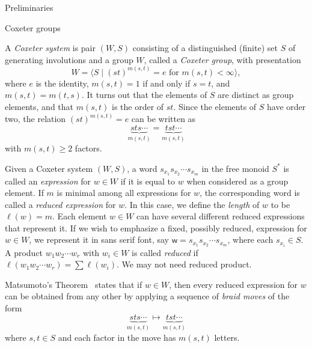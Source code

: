 \documentclass[11pt]{amsart}
\theoremstyle{definition}
\numberwithin{equation}{section}
\newcommand{\supp}{\mathrm{supp}}
\renewcommand{\(}{\left(}
\renewcommand{\)}{\right)}
\newcommand{\w}{\mathsf{w}}
\begin{document}

\begin{section}{Preliminaries}\label{sec:prelim}


\begin{subsection}{Coxeter groups}\label{subsec:coxeter groups}

A \emph{Coxeter system} is pair $(W,S)$ consisting of a distinguished (finite) set $S$ of generating involutions and a group $W$, called a \emph{Coxeter group}, with presentation
\[
W = \langle S \mid (st)^{m(s, t)} = e \text{ for } m(s, t) < \infty \rangle,
\]
where $e$ is the identity, $m(s,t) = 1$ if and only if $s = t$, and $m(s,t) = m(t,s)$. It turns out that the elements of $S$ are distinct as group elements, and that $m(s, t)$ is the order of $st$.  Since the elements of $S$ have order two, the relation $(st)^{m(s,t)} = e$ can be written as
\[
\underbrace{sts \cdots}_{m(s,t)} = \underbrace{tst \cdots}_{m(s,t)}
\]
with $m(s,t) \geq 2$ factors.

Given a Coxeter system $(W,S)$, a word $s_{x_1}s_{x_2}\cdots s_{x_m}$ in the free monoid $S^*$ is called an \emph{expression} for $w\in W$ if it is equal to $w$ when considered as a group element. If $m$ is minimal among all expressions for $w$, the corresponding word is called a \emph{reduced expression} for $w$. In this case, we define the \emph{length} of $w$ to be $\ell(w)=m$. Each element $w \in W$ can have several different reduced expressions that represent it.  If we wish to emphasize a fixed, possibly reduced, expression for $w\in W$, we represent it  in \textsf{sans serif} font, say $\w=s_{x_1}s_{x_2}\cdots s_{x_m}$, where each $s_{x_i} \in S$.  A product $w_{1}w_{2}\cdots w_{r}$ with $w_{i} \in W$ is called \emph{reduced} if $\ell(w_{1}w_{2}\cdots w_{r})=\sum \ell(w_{i})$. {\color{red}We may not need reduced product.}

Matsumoto's Theorem~\cite[Theorem 1.2.2]{Geck2000} states that if $w \in W$, then every reduced expression for $w$ can be obtained from any other by applying a sequence of \emph{braid moves} of the form 
\[
{\underbrace{sts \cdots }_{m(s,t)} } \mapsto {\underbrace{tst \cdots}_{m(s,t)}}
\]
where $s,t \in S$ and each factor in the move has $m(s,t)$ letters.  %


\end{subsection}
\end{section}
\end{document}
